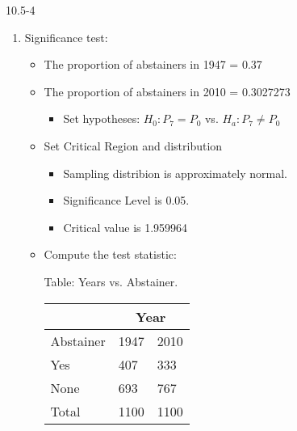 \begin{exsol@solution}{10.5-4}

  	  \begin{enumerate}
	 \item Significance test:


\begin{itemize}
\item The proportion of abstainers in 1947 = 0.37
\item The proportion of abstainers in 2010 = 0.3027273
  \begin{itemize}
  \item Set hypotheses: $H_0: P_7 = P_0$ vs. $H_a: P_7 \ne P_0$
  \end{itemize}

\item Set Critical Region and distribution

  \begin{itemize}
  \item Sampling distribion is approximately normal.
  \item Significance Level is 0.05.
  \item Critical value is 1.959964
  \end{itemize}

\item Compute the test statistic:

\begin{minipage}[h]{6cm}

Table: Years vs. Abstainer.



      \begin{tabular}{@{} p{2.5cm} p{1cm} p{1cm} @{}} \hline %
     &  \multicolumn{2}{c}{Year } \\ \hline
     Abstainer   & 1947 & 2010 \\ \hline
     Yes   & 407 & 333 \\
     None          & 693 & 767 \\ \hline
     Total        & 1100 & 1100 \\ \hline
   \end{tabular}

\end{minipage} \hfill
\begin{minipage}[h]{6cm}


\end{minipage}
\end{itemize}
\end{enumerate}
\end{exsol@solution}
